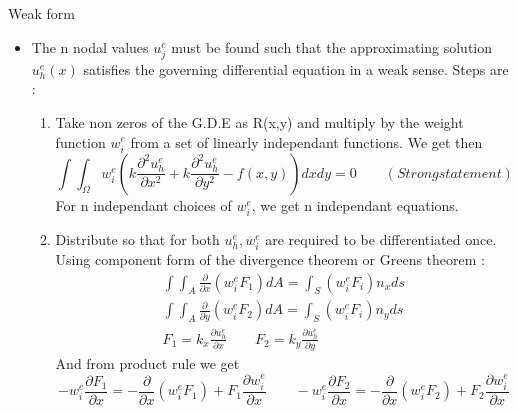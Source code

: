 	\begin{frame}{Weak form}
		\begin{itemize}
			\item The n nodal values $u_j^e$ must be found such that the approximating solution $u_h^e(x)$ satisfies the governing differential equation in a weak sense. Steps are :
			\begin{enumerate}
				\item Take non zeros of the G.D.E as R(x,y) and multiply by the weight function $w_i^e$ from a set of linearly independant functions. We get then 
				\begin{equation}
				\int \int_{\Omega} w_i^e  \left( k \frac{\partial^2 u_h^e}{\partial x^2} + k \frac{\partial^2 u_h^e}{\partial y^2} - f(x,y) \right) dx dy = 0  \qquad( Strong statement)
				\end{equation} For n independant choices of $w_i^e$, we get n independant equations.
				\item Distribute so that for both $u_h^e, w_i^e$ are required to be differentiated once. Using component form of the divergence theorem or Greens theorem : 
				\begin{equation}
				\begin{aligned}
					\int \int_A \frac{\partial}{\partial x} (w_i^e F_1) dA = \int_S (w_i^eF_i)n_x ds   \\
					\int \int_A \frac{\partial}{\partial y} (w_i^e F_2) dA = \int_S (w_i^eF_i)n_y ds   \\
					F_1 = k_x \frac{\partial u^e_h}{\partial x} \qquad 
					F_2 = k_y \frac{\partial u^e_h}{\partial y}
				\end{aligned}
				\end{equation}
				And from product rule we get 
				\begin{equation}
					-w_i^e\frac{\partial F_1}{\partial x} = -\frac{\partial }{\partial x}(w_i^eF_1) + F_1 \frac{\partial w_i^e}{\partial x} 
					\qquad
					-w_i^e\frac{\partial F_2}{\partial x} = -\frac{\partial }{\partial x}(w_i^eF_2) + F_2 \frac{\partial w_i^e}{\partial x} 					
				\end{equation}		
			\end{enumerate}		
		\end{itemize}
	\end{frame}



